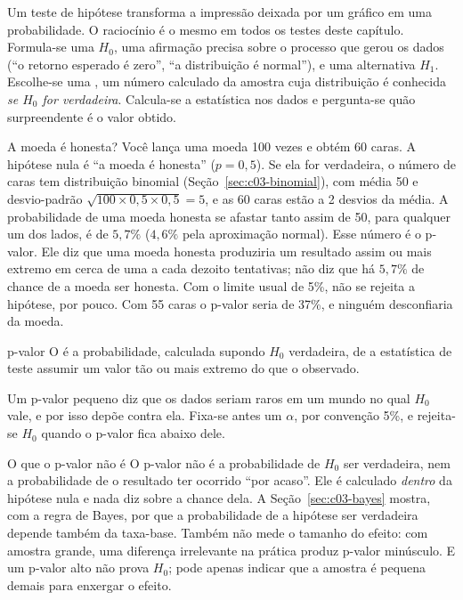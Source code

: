 Um teste de hipótese transforma a impressão deixada por um gráfico em uma probabilidade. O raciocínio é o mesmo em todos os testes deste capítulo. Formula-se uma  $H_0$, uma afirmação precisa sobre o processo que gerou os dados (``o retorno esperado é zero'', ``a distribuição é normal''), e uma alternativa $H_1$. Escolhe-se uma , um número calculado da amostra cuja distribuição é conhecida \emph{se $H_0$ for verdadeira}. Calcula-se a estatística nos dados e pergunta-se quão surpreendente é o valor obtido.

\begin{exemplo}{A moeda é honesta?}
Você lança uma moeda 100 vezes e obtém 60 caras. A hipótese nula é ``a moeda é honesta'' ($p = 0,5$). Se ela for verdadeira, o número de caras tem distribuição binomial (Seção~\ref{sec:c03-binomial}), com média 50 e desvio-padrão $\sqrt{100 \times 0,5 \times 0,5} = 5$, e as 60 caras estão a 2 desvios da média. A probabilidade de uma moeda honesta se afastar tanto assim de 50, para qualquer um dos lados, é de $5,7\%$ ($4,6\%$ pela aproximação normal). Esse número é o p-valor. Ele diz que uma moeda honesta produziria um resultado assim ou mais extremo em cerca de uma a cada dezoito tentativas; não diz que há $5,7\%$ de chance de a moeda ser honesta. Com o limite usual de 5\%, não se rejeita a hipótese, por pouco. Com 55 caras o p-valor seria de 37\%, e ninguém desconfiaria da moeda.
\end{exemplo}

\begin{definicao}{p-valor}
O  é a probabilidade, calculada supondo $H_0$ verdadeira, de a estatística de teste assumir um valor tão ou mais extremo do que o observado.
\end{definicao}

Um p-valor pequeno diz que os dados seriam raros em um mundo no qual $H_0$ vale, e por isso depõe contra ela. Fixa-se antes um  $\alpha$, por convenção 5\%, e rejeita-se $H_0$ quando o p-valor fica abaixo dele.

\begin{armadilha}{O que o p-valor não é}
O p-valor não é a probabilidade de $H_0$ ser verdadeira, nem a probabilidade de o resultado ter ocorrido ``por acaso''. Ele é calculado \emph{dentro} da hipótese nula e nada diz sobre a chance dela. A Seção~\ref{sec:c03-bayes} mostra, com a regra de Bayes, por que a probabilidade de a hipótese ser verdadeira depende também da taxa-base. Também não mede o tamanho do efeito: com amostra grande, uma diferença irrelevante na prática produz p-valor minúsculo. E um p-valor alto não prova $H_0$; pode apenas indicar que a amostra é pequena demais para enxergar o efeito.
\end{armadilha}

